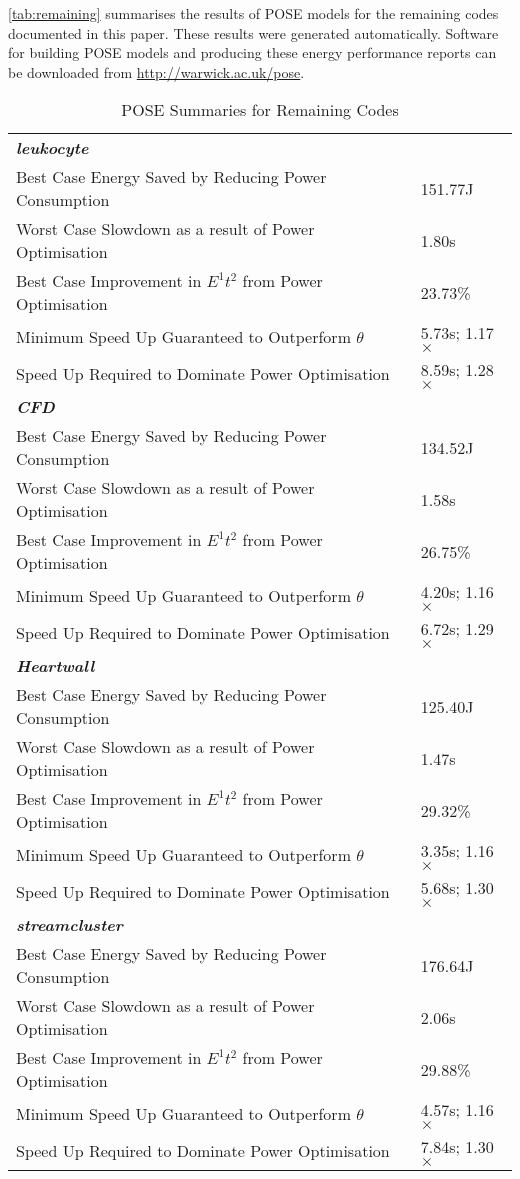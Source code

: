 \label{sec:appendix}
\autoref{tab:remaining} summarises the results of POSE models for the remaining codes documented in this paper.
These results were generated automatically.
Software for building POSE models and producing these energy performance reports can be downloaded from \url{http://warwick.ac.uk/pose}.

\begin{table}[h!]
\caption{POSE Summaries for Remaining Codes}
\label{tab:remaining}
\begin{tabular}{@{}ll@{}}\toprule
 \textbf{\emph{leukocyte}}&\\
 Best Case Energy Saved by Reducing Power Consumption & 151.77J \\
 Worst Case Slowdown as a result of Power Optimisation & 1.80s \\
 Best Case Improvement in $E^1t^2$ from Power Optimisation & 23.73\% \\
 Minimum Speed Up Guaranteed to Outperform $\theta$ & 5.73s; 1.17$\times$ \\
 Speed Up Required to Dominate Power Optimisation & 8.59s; 1.28$\times$ \\
 \rule{0pt}{2.5ex}\textbf{\textit{CFD}}& \\
 Best Case Energy Saved by Reducing Power Consumption & 134.52J \\
 Worst Case Slowdown as a result of Power Optimisation & 1.58s \\
 Best Case Improvement in $E^1t^2$ from Power Optimisation & 26.75\% \\
 Minimum Speed Up Guaranteed to Outperform $\theta$ & 4.20s; 1.16$\times$ \\
 Speed Up Required to Dominate Power Optimisation & 6.72s; 1.29$\times$ \\
 \rule{0pt}{2.5ex}\textbf{\textit{Heartwall}}&\\
 Best Case Energy Saved by Reducing Power Consumption & 125.40J \\
 Worst Case Slowdown as a result of Power Optimisation & 1.47s \\
 Best Case Improvement in $E^1t^2$ from Power Optimisation & 29.32\% \\
 Minimum Speed Up Guaranteed to Outperform $\theta$ & 3.35s; 1.16$\times$ \\
 Speed Up Required to Dominate Power Optimisation & 5.68s; 1.30$\times$ \\
 \rule{0pt}{2.5ex}\textbf{\textit{streamcluster}}&\\
 Best Case Energy Saved by Reducing Power Consumption & 176.64J \\
 Worst Case Slowdown as a result of Power Optimisation & 2.06s \\
 Best Case Improvement in $E^1t^2$ from Power Optimisation & 29.88\% \\
 Minimum Speed Up Guaranteed to Outperform $\theta$ & 4.57s; 1.16$\times$ \\
 Speed Up Required to Dominate Power Optimisation & 7.84s; 1.30$\times$ \\
\bottomrule
\end{tabular}
\end{table}
